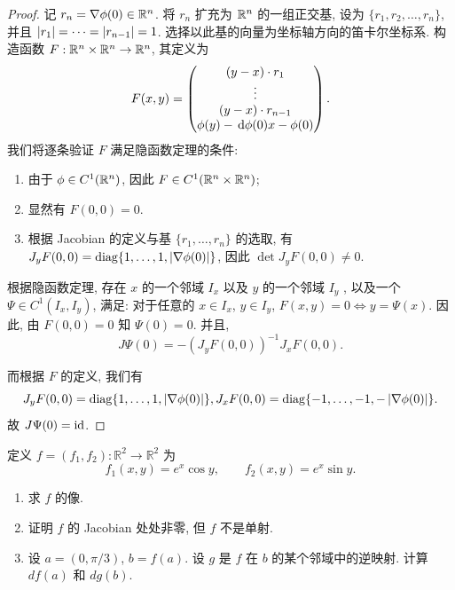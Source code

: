 \documentclass{article}
\begin{document}
\begin{proof}
	记 $r_n = \nabla \phi(0) \in \mathbb{R}^n$. 将 $r_n$ 扩充为 $\mathbb{R}^n$ 的一组正交基, 设为 $\{r_1,r_2,\dots,r_n\}$, 并且 $\left|r_1\right| = \dots = \left|r_{n-1}\right| = 1$. 选择以此基的向量为坐标轴方向的笛卡尔坐标系. 构造函数 $F: \mathbb{R}^n \times \mathbb{R}^n \to \mathbb{R}^n$, 其定义为
	\[ F(x,y) = \begin{pmatrix}
		(y - x) \cdot r_1 \\
		\vdots \\
		(y - x) \cdot r_{n-1} \\
		\phi(y) - \,\mathrm{d} \phi(0)x - \phi(0)
	\end{pmatrix}. \]
	我们将逐条验证 $F$ 满足隐函数定理的条件: 
	\begin{enumerate}[label=(\arabic*)]
		\item 由于 $\phi \in C^1(\mathbb{R}^n)$, 因此 $F \in C^1(\mathbb{R}^n \times \mathbb{R}^n)$;
		\item 显然有 $F(0,0) = 0$.
		\item 根据 Jacobian 的定义与基 $\{r_1, \dots, r_n\}$ 的选取, 有 $J_y F(0, 0) = \operatorname{diag}\{1, \dots, 1, \left|\nabla \phi(0)\right|\}$, 因此 $\det J_y F(0,0) \neq 0$.
	\end{enumerate}

	根据隐函数定理, 存在 $x$ 的一个邻域 $I_x$ 以及 $y$ 的一个邻域 $I_y$ , 以及一个 $\Psi \in C^1 (I_x, I_y)$, 满足: 对于任意的 $x \in I_x$, $y \in I_y$, $F(x,y) = 0 \Longleftrightarrow y = \Psi(x)$. 因此, 由 $F(0, 0) = 0$ 知 $\Psi(0) = 0$. 并且, 
	\[ J\Psi(0) = -(J_y F(0, 0))^{-1} J_x F(0, 0). \]
	
	而根据 $F$ 的定义, 我们有
	\[ J_yF(0,0) = \operatorname{diag}\{1, \dots, 1, \left|\nabla \phi(0)\right|\}, 
	J_xF(0,0) = \operatorname{diag}\{-1, \dots, -1, -\left|\nabla \phi(0)\right|\}. \]
	故 $J \Psi(0) = \operatorname{id} $.
\end{proof}



\begin{problem}
  定义 $f=(f_1,f_2):\mathbb{R}^2\to\mathbb{R}^2$ 为
  \[
    f_1(x,y)=e^x\cos y,\qquad f_2(x,y)=e^x\sin y.
  \]
  \begin{enumerate}
    \item[(a)] 求 $f$ 的像.
    \item[(b)] 证明 $f$ 的 Jacobian 处处非零, 但 $f$ 不是单射.
    \item[(c)] 设 $a=(0,\pi/3)$, $b=f(a)$. 设 $g$ 是 $f$ 在 $b$ 的某个邻域中的逆映射. 计算 $df(a)$ 和 $dg(b)$.
  \end{enumerate}
\end{problem}
\end{document}
